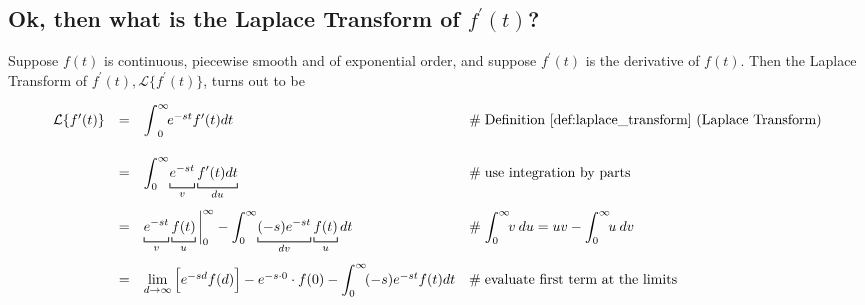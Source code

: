\documentclass{article}
\theoremstyle{definition}
\begin{document}
\newpage

\subsection{Ok, then what is the Laplace Transform of $f^\prime (t)$?}
\label{sec:f_prime}
Suppose $f(t)$ is continuous, piecewise smooth and of exponential order, and suppose $f^\prime(t)$ is the derivative of $f(t)$. Then the
Laplace Transform of $f^\prime(t), \mathcal{L}\{f^\prime(t)\}$, turns out to be

\begin{equation*}
\begin{array}{lllll}
\mathcal{L}\{f^\prime(t)\}
&=& \mathlarger{\int} ^\infty_0 \! e^{-st}  f^\prime(t) dt                                                                                                                      &\mathrel{\#} \text{Definition \ref{def:laplace_transform} (Laplace Transform)}       \\  
[20pt]                                                                                                                                                                                                 %
&=& \mathlarger{\int}^\infty_0 \! \underbracket [0.15 ex] {\strut e^{-st}}_{v}  \underbracket [0.15 ex] {\strut f^\prime(t) dt}_{du}      &\mathrel{\#} \text{use integration by parts}                                                             \\  
[20pt]                                                                                                                                                                                                 %
&=& \underbracket [0.15 ex] {\strut e^{-st}}_{v}  \underbracket [0.15 ex] {\strut f(t)}_{u} \bigg |^\infty_0   -   
        \mathlarger{\int}^\infty_0 \! \underbracket [0.15 ex] {\strut (-s) e^{-st}}_{dv}  \underbracket [0.15 ex] {\strut f(t)}_{u} dt 
        &\mathrel{\#} \mathlarger{\int}_0^\infty \! v \: du = uv - \mathlarger{\int}_0^\infty \! u \: dv                                                                                                                                                                                          \\  
[20pt]                                                                                                                                                                                                 %
&=& \lim\limits_{d \to \infty}\Big [e^{-sd} f(d) \Big ] - e^{-s \cdot 0} \cdot f(0) - \mathlarger{\int}^\infty_0 \!  (-s) e^{-st}  f(t) dt           &\mathrel{\#} \text{evaluate first term at the limits}                                                   \\

\end{array}
\end{equation*}
\end{document}
